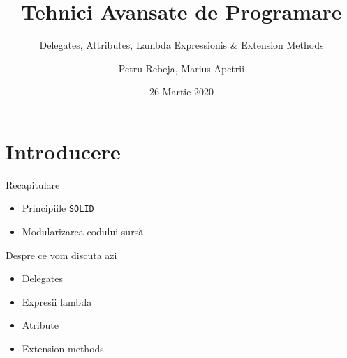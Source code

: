 \documentclass[presentation]{beamer}
\author{Petru Rebeja, Marius Apetrii}
\date{26 Martie 2020}
\title{Tehnici Avansate de Programare}
\subtitle{Delegates,  Attributes, Lambda Expressionis \& Extension Methods}
\institute[UAIC]{Facultatea de Matematică\\Universitatea Alexandru Ioan Cuza, Iași}
\begin{document}
\maketitle
\section{Introducere}
\label{sec:org226baf2}
\begin{frame}[label={sec:orgfdae5e9},fragile]{Recapitulare}
 \begin{itemize}
\item Principiile \texttt{SOLID}
\item Modularizarea codului-sursă
\end{itemize}
\end{frame}
\begin{frame}[label={sec:orga8a5637}]{Despre ce vom discuta azi}
\begin{itemize}
\item Delegates
\item Expresii lambda
\item Atribute
\item Extension methods
\end{itemize}
\end{frame}
\end{document}
